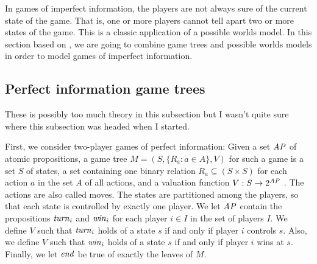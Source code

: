 In games of imperfect information, the players are not always sure of the current state of the game. That is, one or more players cannot tell apart two or more states of the game. This is a classic application of a possible worlds model. In this section based on \cite{benthem2001a}, we are going to combine game trees and possible worlds models in order to model games of imperfect information.


\subsection{Perfect information game trees} \label{seq:perfect-information}

{ \color{red} These is possibly too much theory in this subsection but I wasn't quite sure where this subsection was headed when I started. }

First, we consider two-player games of perfect information: Given a set $ \mathit{AP} $ of atomic propositions, a game tree $ M = (S, \{ R_{a} : a \in A \}, V) $ for such a game is a set $ S $ of states, a set containing one binary relation $ R_{a} \subseteq (S \times S) $ for each action $ a $ in the set $ A $ of all actions, and a valuation function $ V : S \rightarrow 2^{\mathit{AP}} $ \cite{benthem2001a}. The actions are also called moves. The states are partitioned among the players, so that each state is controlled by exactly one player. We let $ \mathit{AP} $ contain the propositions $ \mathit{turn}_{i} $ and $ \mathit{win}_{i} $ for each player $ i \in I $ in the set of players $ I $. We define $ V $ such that $ \mathit{turn}_{i} $ holds of a state $ s $ if and only if player $ i $ controls $ s $. Also, we define $ V $ such that $ \mathit{win}_{i} $ holds of a state $ s $ if and only if player $ i $ wins at $ s $. Finally, we let $ \mathit{end} $ be true of exactly the leaves of $ M $.

